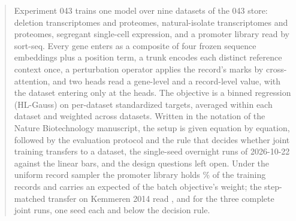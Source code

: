 
\begin{abstract}
\noindent
Experiment 043 trains one model over nine datasets of the 043 store: deletion
transcriptomes and proteomes, natural-isolate transcriptomes and proteomes, segregant
single-cell expression, and a promoter library read by sort-seq. Every gene enters as a
composite of four frozen sequence embeddings plus a position term, a trunk encodes each
distinct reference context once, a perturbation operator applies the record's marks by
cross-attention, and two heads read a gene-level and a record-level value, with the dataset
entering only at the heads. The objective is a binned regression (HL-Gauss) on per-dataset
standardized targets, averaged within each dataset and weighted across datasets. Written
in the notation of the Nature Biotechnology manuscript, the setup is given equation by
equation, followed by the evaluation protocol and the rule that decides whether joint
training transfers to a dataset, the single-seed overnight runs of 2026-10-22 against the
linear bars, and the design questions left open. Under the uniform record sampler the
promoter library holds \tdVaishnavPct\% of the training records and carries an expected
\tdVaishnavWeightEqual{} of the batch objective's weight; the step-matched transfer on
Kemmeren 2014 read \tdTransferRecords{}, \tdTransferBalanced{} and \tdTransferPinball{}
for the three complete joint runs, one seed each and below the decision rule.
\end{abstract}
